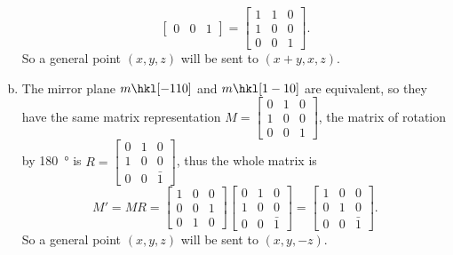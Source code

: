 \documentclass[openany]{homework}
\begin{document}
\begin{enumerate}[a.]
\begin{equation}
\begin{bmatrix}
                              0       & 0 & 1
                      \end{bmatrix} =
                      \begin{bmatrix}
                              1 & 1 & 0 \\
                              1 & 0 & 0 \\
                              0 & 0 & 1
                      \end{bmatrix}.
              \end{equation}
              So a general point $(x, y, z)$ will be sent to $(x+y, x, z)$.
        \item The mirror plane $m \hkl[-1 1 0]$ and $m \hkl[1 -1 0]$ are equivalent, so they have the same matrix representation
              $M = \left[\begin{smallmatrix}
                                      0 & 1 & 0\\
                                      1 & 0 & 0\\
                                      0 & 0 & 1
                              \end{smallmatrix}
                              \right]$, the matrix of rotation by \SI{180}{\degree} is
              $R = \left[\begin{smallmatrix}
                                      0 & 1 & 0\\
                                      1 & 0 & 0\\
                                      0 & 0 & \bar{1}
                              \end{smallmatrix}
                              \right]$, thus the whole matrix is
              \begin{equation}
                      M' = M R = \begin{bmatrix}
                              1 & 0 & 0 \\
                              0 & 0 & 1 \\
                              0 & 1 & 0
                      \end{bmatrix}
                      \begin{bmatrix}
                              0 & 1 & 0       \\
                              1 & 0 & 0       \\
                              0 & 0 & \bar{1}
                      \end{bmatrix} =
                      \begin{bmatrix}
                              1 & 0 & 0       \\
                              0 & 1 & 0       \\
                              0 & 0 & \bar{1}
                      \end{bmatrix}.
              \end{equation}
              So a general point $(x, y, z)$ will be sent to $(x, y, -z)$.
\end{enumerate}
\end{document}
